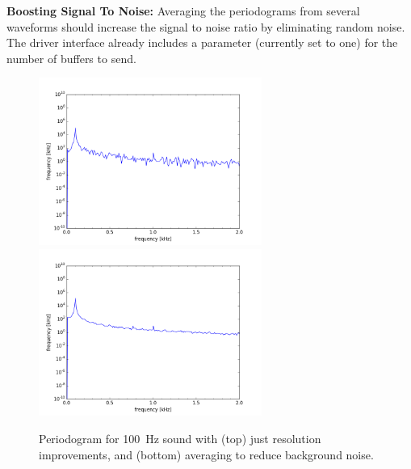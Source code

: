 \documentclass[12pt]{article}
\begin{document}
\noindent
{\bf Boosting Signal To Noise:}  Averaging the periodograms from several waveforms should increase the signal to noise ratio by eliminating random noise.  The driver interface already includes a parameter (currently set to one) for the number of buffers to send.

\begin{figure}[htbp]
\begin{center}
{\includegraphics[width=0.65\textwidth]{figs/res100hz.png}} \\
{\includegraphics[width=0.65\textwidth]{figs/avg100hz.png}}
\end{center}
\caption{\label{fig:periodogram2} Periodogram for 100~Hz sound with (top) just resolution improvements, and (bottom) averaging to reduce background noise. }
\end{figure}
\end{document}
